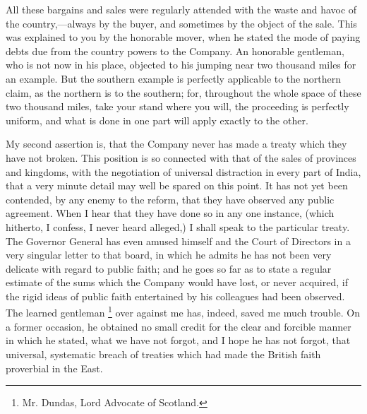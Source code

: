 All these bargains and sales were regularly attended with the waste and havoc of the country,—always by the buyer, and sometimes by the object of the sale. This was explained to you by the honorable mover, when he stated the mode of paying debts due from the country powers to the Company. An honorable gentleman, who is not now in his place, objected to his jumping near two thousand miles for an example. But the southern example is perfectly applicable to the northern claim, as the northern is to the southern; for, throughout the whole space of these two thousand miles, take your stand where you will, the proceeding is perfectly uniform, and what is done in one part will apply exactly to the other.

My second assertion is, that the Company never has made a treaty which they have not broken. This position is so connected with that of the sales of provinces and kingdoms, with the negotiation of universal distraction in every part of India, that a very minute detail may well be spared on this point. It has not yet been contended, by any enemy to the reform, that they have observed any public agreement. When I hear that they have done so in any one instance, (which hitherto, I confess, I never heard alleged,) I shall speak to the particular treaty. The Governor General has even amused himself and the Court of Directors in a very singular letter to that board, in which he admits he has not been very delicate with regard to public faith; and he goes so far as to state a regular estimate of the sums which the Company would have lost, or never acquired, if the rigid ideas of public faith entertained by his colleagues had been observed. The learned gentleman 
\footnote{ Mr. Dundas, Lord Advocate of Scotland.}
 over against me has, indeed, saved me much trouble. On a former occasion, he obtained no small credit for the clear and forcible manner in which he stated, what we have not forgot, and I hope he has not forgot, that universal, systematic breach of treaties which had made the British faith proverbial in the East.

